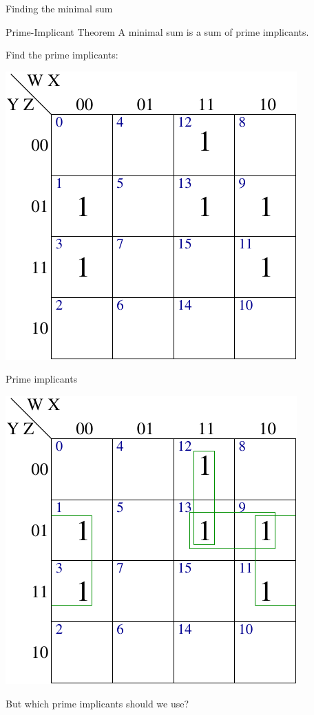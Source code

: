 \begin{frame}{Finding the minimal sum}
  \begin{block}{Prime-Implicant Theorem}
    A minimal sum is a sum of prime implicants.
  \end{block}
  Find the prime implicants:
  \begin{center}
    \includegraphics[scale=0.7]{4VariableKMapExample}
  \end{center}
\end{frame}

\begin{frame}{Prime implicants}
  \begin{center}
    \includegraphics[scale=0.7]{4VariableKMapExamplePrimeImplicant}
  \end{center}
  But which prime implicants should we use?
\end{frame}

